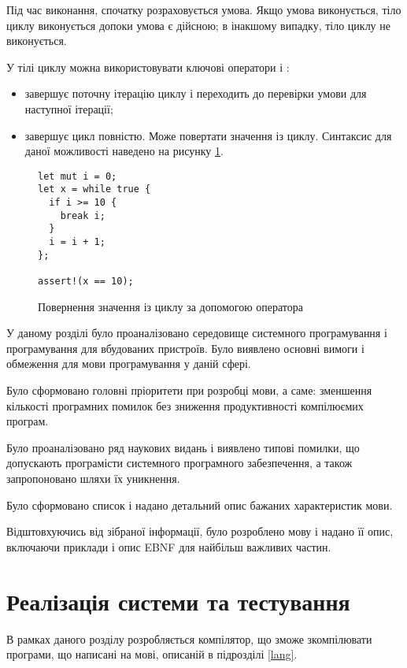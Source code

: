\documentclass[main.tex]{subfiles}
\begin{document}
Під час виконання, спочатку розраховується умова. Якщо умова виконується, тіло циклу виконується допоки умова є дійсною; в інакшому випадку, тіло циклу не виконується.

У тілі циклу можна використовувати ключові оператори  і :
\begin{itemize}[nosep]
\item {} завершує поточну ітерацію циклу і переходить до перевірки умови для наступної ітерації;
\item {} завершує цикл повністю. Може повертати значення із циклу. Синтаксис для даної можливості наведено на рисунку \ref{lang:break-value}.
\end{itemize}

\begin{figure}[h]
  \centering
  \begin{verbatim}
let mut i = 0;
let x = while true {
  if i >= 10 {
    break i;
  }
  i = i + 1;
};

assert!(x == 10);
  \end{verbatim}
  \caption{Повернення значення із циклу за допомогою оператора }
  \label{lang:break-value}
\end{figure}

\chapterconslusions{}
У даному розділі було проаналізовано середовище системного програмування і програмування для вбудованих пристроїв.
Було виявлено основні вимоги і обмеження для мови програмування у даній сфері.

Було сформовано головні пріоритети при розробці мови, а саме: зменшення кількості програмних помилок без зниження продуктивності компілюємих програм.

Було проаналізовано ряд наукових видань і виявлено типові помилки, що допускають програмісти системного програмного забезпечення, а також запропоновано шляхи їх уникнення.

Було сформовано список і надано детальний опис бажаних характеристик мови.

Відштовхуючись від зібраної інформації, було розроблено мову і надано її опис, включаючи приклади і опис EBNF для найбільш важливих частин.


\chapter{Реалізація системи та тестування}
В рамках даного розділу розробляється компілятор, що зможе зкомпілювати програми, що написані на мові, описаній в підрозділі \ref{lang}.
\end{document}
